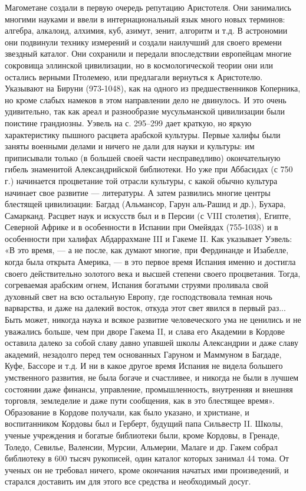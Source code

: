 Магометане создали в первую очередь репутацию Аристотеля. Они
занимались многими науками и ввели в интернациональный язык много
новых терминов: алгебра, алкалоид, алхимия, куб, азимут, зенит,
алгоритм и т.д. В астрономии они подвинули технику измерений и
создали наилучший для своего времени звездный каталог. Они сохранили и
передали впоследствии европейцам многие сокровища эллинской
цивилизации, но в космологической теории они или остались верными
Птолемею, или предлагали вернуться к Аристотелю. Указывают на Бируни
(973-1048), как на одного из предшественников Коперника, но кроме
слабых намеков в этом направлении дело не двинулось. И это очень
удивительно, так как ареал и разнообразие мусульманской цивилизации
были поистине грандиозны. Уэвель на с. 295--299 дает краткую, но яркую
характеристику пышного расцвета арабской культуры. Первые халифы были
заняты военными делами и ничего не дали для науки и культуры: им
приписывали только (в большей своей части несправедливо) окончательную
гибель знаменитой Александрийской библиотеки. Но уже при Аббасидах (с
750 г.) начинается процветание той отрасли культуры, с какой обычно
культура начинает свое развитие --- литературы. А затем развились
многие центры блестящей цивилизации: Багдад (Альмансор, Гарун
аль-Рашид и др.), Бухара, Самарканд. Расцвет наук и искусств был и в
Персии (с VIII столетия), Египте, Северной Африке и в особенности в
Испании при Омейядах (755-1038) и в особенности при халифах
Абдаррахмане III и Гакеме II. Как указывает Уэвель: «В это время, ---
а не после, как думают многие, при Фердинанде и Изабелле, когда была
открыта Америка, --- в это первое время Испания именно и достигла
своего действительно золотого века и высшей степени своего
процветания. Тогда, согреваемая арабским огнем, Испания богатыми
струями проливала свой духовный свет на всю остальную Европу, где
господствовала темная ночь варварства, и даже на далекий восток,
откуда этот свет явился в первый раз... Быть может, никогда наука и
всякое развитие человеческого ума не ценились и не уважались больше,
чем при дворе Гакема II, и слава его Академии в Кордове оставила
далеко за собой славу давно упавшей школы Александрии и даже славу
академий, незадолго перед тем основанных Гаруном и Маммуном в Багдаде,
Куфе, Бассоре и т.д. И ни в какое другое время Испания не видела
большего умственного развития, не была богаче и счастливее, и никогда
не были в лучшем состоянии даже финансы, управление, промышленность,
внутренняя и внешняя торговля, земледелие и даже пути сообщения, как в
это блестящее время». Образование в Кордове получали, как было
указано, и христиане, и воспитанником Кордовы был и Герберт, будущий
папа Сильвестр II. Школы, ученые учреждения и богатые библиотеки были,
кроме Кордовы, в Гренаде, Толедо, Севилье, Валенсии, Мурсии, Альмерии,
Малаге и др. Гакем собрал библиотеку в 600 тысяч рукописей, один
каталог которых занимал 44 тома. От ученых он не требовал ничего,
кроме окончания начатых ими произведений, и старался доставить им для
этого все средства и необходимый досуг.

